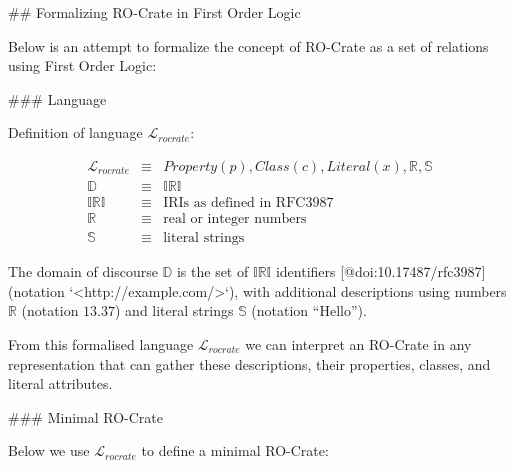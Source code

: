 


\begin{markdown}
## Formalizing RO-Crate in First Order Logic

Below is an attempt to formalize the concept of RO-Crate as a set of relations using First Order Logic:

### Language

\end{markdown}

Definition of language $\mathcal{L}_{rocrate}$:

\begin{eqnarray*}
    \mathcal{L}_{rocrate}   & \equiv & { Property(p), Class(c), 
                            Literal(x), \mathbb{R}, \mathbb{S} } \\
    \mathbb{D}              & \equiv & \mathbb{IRI} \\
    \mathbb{IRI}            & \equiv & { \text{IRIs as defined in RFC3987} } \\
    \mathbb{R}              & \equiv & { \text{real or integer numbers} } \\
    \mathbb{S}              & \equiv & { \text{literal strings} }
\end{eqnarray*}

\begin{markdown}
The domain of discourse $\mathbb{D}$ is the set of $\mathbb{IRI}$ identifiers [@doi:10.17487/rfc3987] (notation `<http://example.com/>`), with additional descriptions using numbers $\mathbb{R}$ (notation $13.37$) and literal strings $\mathbb{S}$ (notation $\text{“Hello”}$). 

From this formalised language $\mathcal{L}_{rocrate}$ we can interpret an RO-Crate in any representation that can gather these descriptions, their properties, classes, and literal attributes.  
\end{markdown}

\begin{markdown}
### Minimal RO-Crate

Below we use $\mathcal{L}_{rocrate}$ to define a minimal RO-Crate:
\end{markdown}

